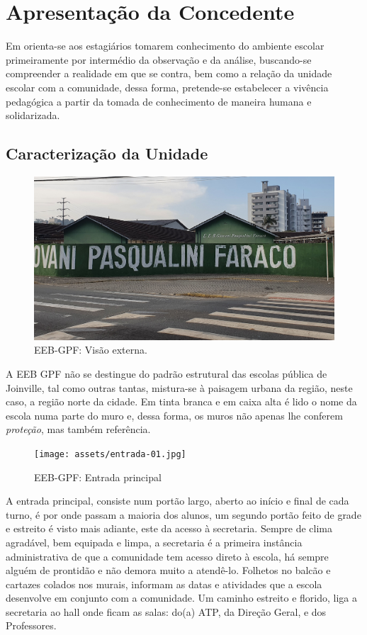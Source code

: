\chapter{Apresentação da Concedente} %
\label{chap:Apresentação da Concedente}
Em \cite{CARVALHO:2012} orienta-se aos estagiários tomarem conhecimento do ambiente escolar primeiramente por intermédio da observação e da análise, buscando-se compreender a realidade em que se contra, bem como a relação da unidade escolar com a comunidade, dessa forma, pretende-se estabelecer a vivência pedagógica a partir da tomada de conhecimento de maneira humana e solidarizada.

\section{Caracterização da Unidade} %
\label{sec:Caracterização da Unidade}
\setlength\intextsep{0pt}
\begin{figure}
	\centering
	\label{fig:vista-externa}
	\caption{EEB-GPF: Visão externa.}
	\includegraphics[width=.45\textwidth]{assets/vista-ext01.jpg}
\end{figure}
A \ac{EEB} \ac{GPF} não se destingue do padrão estrutural das escolas pública de Joinville, tal como outras tantas, mistura-se à paisagem urbana da região, neste caso, a região norte da cidade. Em tinta branca e em caixa alta é lido o nome da escola numa parte do muro e, dessa forma, os muros não apenas lhe conferem \emph{proteção}, mas também referência.

\setlength\intextsep{0pt}
\begin{figure}
	\centering
	\label{fig:entr-principal}
	\caption{EEB-GPF: Entrada principal}
	\texttt{[image: assets/entrada-01.jpg]}
\end{figure} A entrada principal, consiste num portão largo, aberto ao início e final de cada turno, é por onde passam a maioria dos alunos, um segundo portão feito de grade e estreito é visto mais adiante, este da acesso à secretaria. Sempre de clima agradável, bem equipada e limpa, a secretaria é a primeira instância administrativa de que a comunidade tem acesso direto à escola, há sempre alguém de prontidão e não demora muito a atendê-lo. Folhetos no balcão e cartazes colados nos murais, informam as datas e atividades que a escola desenvolve em conjunto com a comunidade. Um caminho estreito e florido, liga a secretaria ao hall onde ficam as salas: do(a) \ac{ATP}, da Direção Geral, e dos Professores.

